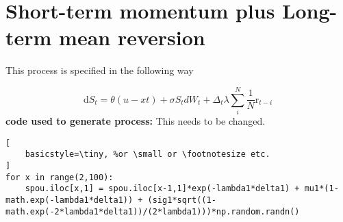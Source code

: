 \documentclass[a4paper, 11pt]{article}
\begin{document}
\section{Short-term momentum plus Long-term mean reversion}
This process is specified in the following way

$$
{\mbox{d}{S}_{t} = \theta({u} - {x}{t})} + \sigma{S}_{t} {d}{W}_{t} + \Delta_{t}\lambda \textstyle{\sum_{i}^{N}}\frac{1}{N}{\mbox{r}_{t-i}}
$$
\textbf{code used to generate process:} This needs to be changed.
\begin{lstlisting}[
    basicstyle=\tiny, %or \small or \footnotesize etc.
]
for x in range(2,100):
	spou.iloc[x,1] = spou.iloc[x-1,1]*exp(-lambda1*delta1) + mu1*(1-math.exp(-lambda1*delta1)) + (sig1*sqrt((1-math.exp(-2*lambda1*delta1))/(2*lambda1)))*np.random.randn()
\end{lstlisting} \hfill \\ \\
\end{document}
